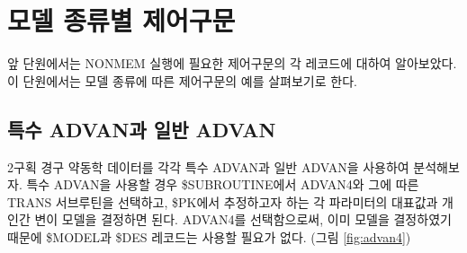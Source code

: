 \documentclass[
  10pt,
]{krantz}
\begin{document}
\hypertarget{uxbaa8uxb378-uxc885uxb958uxbcc4-uxc81cuxc5b4uxad6cuxbb38}{%
\section{모델 종류별 제어구문}\label{uxbaa8uxb378-uxc885uxb958uxbcc4-uxc81cuxc5b4uxad6cuxbb38}}

앞 단원에서는 NONMEM 실행에 필요한 제어구문의 각 레코드에 대하여 알아보았다. 이 단원에서는 모델 종류에 따른 제어구문의 예를 살펴보기로 한다.

\hypertarget{uxd2b9uxc218-advanuxacfc-uxc77cuxbc18-advan}{%
\subsection{특수 ADVAN과 일반 ADVAN}\label{uxd2b9uxc218-advanuxacfc-uxc77cuxbc18-advan}}

2구획 경구 약동학 데이터를 각각 특수 ADVAN과 일반 ADVAN을 사용하여 분석해보자. 특수 ADVAN을 사용할 경우 \$SUBROUTINE에서 ADVAN4와 그에 따른 TRANS 서브루틴을 선택하고, \$PK에서 추정하고자 하는 각 파라미터의 대표값과 개인간 변이 모델을 결정하면 된다. ADVAN4를 선택함으로써, 이미 모델을 결정하였기 때문에 \$MODEL과 \$DES 레코드는 사용할 필요가 없다. (그림 \ref{fig:advan4})
\end{document}
